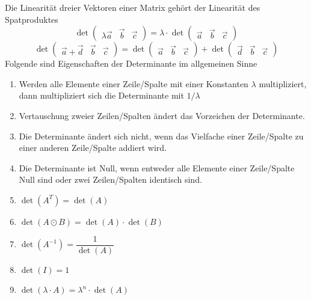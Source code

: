 Die Linearität dreier Vektoren einer Matrix gehört der Linearität des Spatproduktes
\begin{equation}
\boxed{\det\begin{pmatrix}\lambda\overrightarrow{a}&\overrightarrow{b}&\overrightarrow{c}\end{pmatrix}=\lambda\cdot \det\begin{pmatrix}\overrightarrow{a}&\overrightarrow{b}&\overrightarrow{c}\end{pmatrix}}
\end{equation}
\begin{equation}
\boxed{\det\begin{pmatrix}\overrightarrow{a}+\overrightarrow{d}&\overrightarrow{b}&\overrightarrow{c}\end{pmatrix}=\det\begin{pmatrix}\overrightarrow{a}&\overrightarrow{b}&\overrightarrow{c}\end{pmatrix}+\det\begin{pmatrix}\overrightarrow{d}&\overrightarrow{b}&\overrightarrow{c}\end{pmatrix}}
\end{equation}
Folgende sind Eigenschaften der Determinante im allgemeinen Sinne
\begin{enumerate}[$(i)$]
\item Werden alle Elemente einer Zeile/Spalte mit einer Konstanten $\lambda$ multipliziert, dann multipliziert sich die Determinante mit $1/\lambda$
\item Vertauschung zweier Zeilen/Spalten ändert das Vorzeichen der Determinante.
\item Die Determinante ändert sich nicht, wenn das Vielfache einer Zeile/Spalte zu einer anderen Zeile/Spalte addiert wird.
\item Die Determinante ist Null, wenn entweder alle Elemente einer Zeile/Spalte Null sind oder zwei Zeilen/Spalten identisch sind.
\item $\det\left(A^T\right)=\det\left(A\right)$
\item $\det\left(A\odot B\right)=\det\left(A\right)\cdot \det\left(B\right)$
\item $\det\left(A^{-1}\right)=\dfrac{1}{\det\left(A\right)}$
\item $\det\left(I\right)=1$
\item $\det\left(\lambda\cdot A\right)=\lambda^n\cdot \det\left(A\right)$
\end{enumerate}
